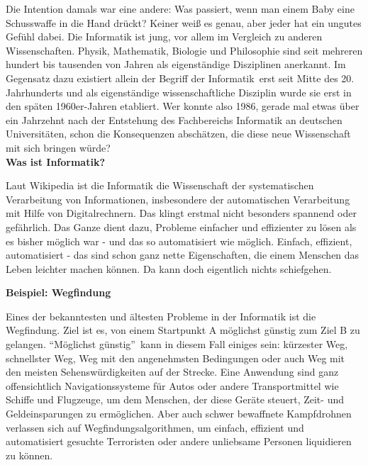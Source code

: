 {Die Intention damals war eine andere: Was passiert, wenn man einem Baby eine Schusswaffe in die Hand drückt? Keiner weiß es genau, aber jeder hat ein ungutes Gefühl dabei.
    Die Informatik ist jung, vor allem im Vergleich zu anderen Wissenschaften. Physik, Mathematik, Biologie und Philosophie sind seit mehreren hundert bis tausenden von Jahren als eigenständige Disziplinen anerkannt.  Im Gegensatz dazu existiert allein der Begriff der \glqq Informatik\grqq~erst seit Mitte des 20. Jahrhunderts und als eigenständige wissenschaftliche Disziplin wurde sie erst in den späten 1960er-Jahren etabliert.
    Wer konnte also 1986, gerade mal etwas über ein Jahrzehnt nach der Entstehung des Fachbereichs Informatik an deutschen Universitäten, schon die Konsequenzen abschätzen, die diese neue Wissenschaft mit sich bringen würde?\\

    \textbf{Was ist Informatik?}

    Laut Wikipedia ist die Informatik die \glqq Wissenschaft der systematischen Verarbeitung von Informationen, insbesondere der automatischen Verarbeitung mit Hilfe von Digitalrechnern\grqq.
    Das klingt erstmal nicht besonders spannend oder gefährlich. Das Ganze dient dazu, Probleme einfacher und effizienter  zu lösen als es bisher möglich war - und das so automatisiert wie möglich. Einfach, effizient, automatisiert - das sind schon ganz nette Eigenschaften, die einem Menschen das Leben leichter machen können. Da kann doch eigentlich nichts schiefgehen.\\

    \columnbreak

    \textbf{Beispiel: Wegfindung}

    Eines der bekanntesten und ältesten Probleme in der Informatik ist die Wegfindung. Ziel ist es, von einem Startpunkt A möglichst günstig zum Ziel B zu gelangen. \enquote{Möglichst günstig}~kann in diesem Fall einiges sein: kürzester Weg, schnellster Weg, Weg mit den angenehmsten Bedingungen oder auch Weg mit den meisten Sehenswürdigkeiten auf der Strecke. Eine Anwendung sind ganz offensichtlich Navigationssysteme für Autos oder andere Transportmittel wie Schiffe und Flugzeuge, um dem Menschen, der diese Geräte steuert, Zeit- und Geldeinsparungen zu ermöglichen. Aber auch schwer bewaffnete Kampfdrohnen verlassen sich auf Wegfindungsalgorithmen, um einfach, effizient und automatisiert gesuchte Terroristen oder andere unliebsame Personen liquidieren zu können.\\

}
